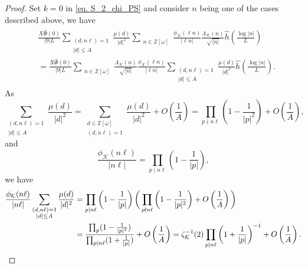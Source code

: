 \documentclass[11pt]{amsart}
\numberwithin{equation}{section}
\theoremstyle{remark}
\begin{document}
\begin{proof}
Set $k=0$ in \eqref{eq. S_2_chi_PS} and consider $n$ being one of the cases described above, we have
\begin{align}
\label{eq. S_2 main term}
\begin{split}
	&\frac{X\widehat{\Phi}(0)}{|9|L}
    \sum_{\substack{(d, n\ell)=1\\ |d|\le A}}\frac{\mu(d)}{|d|^2}
	\sum_{\substack{n\in \mathbb{Z}[\omega]}}
    \frac{\phi_\mathcal{K}(\ell n)}{|\ell n|}   
    \frac{\Lambda_\mathcal{K}(n)}{\sqrt{|n|}}
	\hat{h}\left(\frac{\log |n|}{L}\right)
    \\
    &=
    \frac{X\widehat{\Phi}(0)}{|9|L}
	\sum_{\substack{n\in \mathbb{Z}[\omega]}}
 \frac{\Lambda_\mathcal{K}(n)}{\sqrt{|n|}}  
 \frac{\phi_\mathcal{K}(\ell n)}{|\ell n|} 
 \sum_{\substack{(d, n\ell)=1\\ |d|\le A}}\frac{\mu(d)}{|d|^2}
	\hat{h}\left(\frac{\log |n|}{L}\right).
    \end{split}
\end{align}
As $$
\sum_{\substack{(d, n\ell)=1\\ |d|\le A}}\frac{\mu(d)}{|d|^2}
= 
\sum_{\substack{d\in \mathbb{Z}[\omega]\\(d, n\ell)=1}}\frac{\mu(d)}{|d|^2}
+O\left(\frac{1}{A}\right)
=
\prod_{p \nmid n\ell} \left(1-\frac{1 }{|p|^2}\right) +O\left(\frac{1}{A}\right) ,
$$
and
$$\frac{\phi_\mathcal{K}(n\ell)}{|n\ell|}=\prod_{p\mid n\ell} \left(1-\frac{1}{|p|}\right),$$
we have
\begin{align}
\label{eq. Euler product S_2}
\frac{\phi_\mathcal{K}(n\ell)}{|n\ell|}
\sum_{\substack{(d, n\ell)=1\\ |d|\le A}}\frac{\mu(d)}{|d|^2}
&=
\prod_{p\mid n\ell} \left(1-\frac{1}{|p|}\right) \bigg(\prod_{p \nmid n\ell} \left(1-\frac{1 }{|p|^2}\right) +O\left(\frac{1}{A}\right)\bigg) \notag
\\
&=
\frac{\prod_p(1-\frac{1}{|p|^2})}{\prod_{p\mid n\ell}(1+\frac{1}{|p|})} + O\left(\frac{1}{A}\right)
=
\zeta^{-1}_\mathcal{K}(2)  \prod_{p\mid n\ell}\left(1+\frac{1}{|p|}\right)^{-1} +O\left(\frac{1}{A}\right).
\end{align}


\end{proof}
\end{document}
